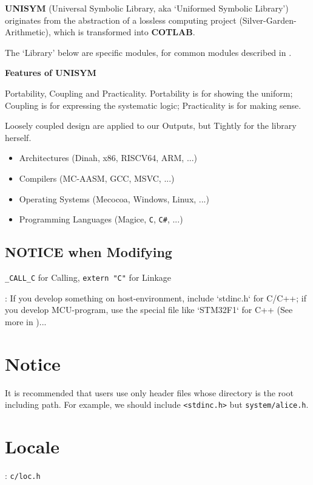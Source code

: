 

\textbf{UNISYM} (Universal Symbolic Library, aka `Uniformed Symbolic Library') originates from the abstraction of a lossless computing project (Silver-Garden-Arithmetic), which is transformed into \textbf{COTLAB}.

The `Library' below are specific modules, for common modules described in .

\textbf{Features of UNISYM}

Portability, Coupling and Practicality. Portability is for showing the uniform; Coupling is for expressing the systematic logic; Practicality is for making sense.

Loosely coupled design are applied to our Outputs, but Tightly for the library herself.

\begin{itemize}
\item Architectures (Dinah, x86, RISCV64, ARM, ...)
\item Compilers (MC-AASM, GCC, MSVC, ...)
\item Operating Systems (Mecocoa, Windows, Linux, ...)
\item Programming Languages (Magice, \verb|C|, \verb|C#|, ...)
\end{itemize}

\subsection{NOTICE when Modifying}

\verb`_CALL_C` for Calling, \verb`extern "C"` for Linkage


:
If you develop something on host-environment, include `stdinc.h` for C/C++;
if you develop MCU-program, use the special file like `STM32F1` for C++ (See more in )...

\section{Notice}

It is recommended that users use only header files whose directory is the root including path. For example, we should include \verb`<stdinc.h>` but \verb|system/alice.h|.


\section{Locale}
: \verb`c/loc.h`

